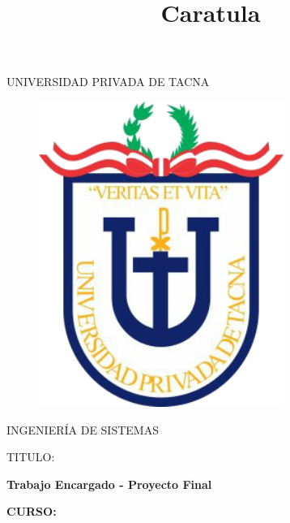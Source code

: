 \documentclass[12pt,letterpaper]{article}
\begin{document}
%


\title{Caratula}

\begin{titlepage}
\begin{center}
\large{UNIVERSIDAD PRIVADA DE TACNA}\\
\vspace*{-0.025in}
\begin{figure}[htb]
\begin{center}
\includegraphics[width=8cm]{./Imagenes/logo}
\end{center}
\end{figure}
\vspace*{0.15in}
INGENIERÍA DE SISTEMAS  \\

\vspace*{0.5in}
\begin{large}
TITULO:\\
\end{large}

\vspace*{0.1in}
\begin{Large}
\textbf{Trabajo Encargado - Proyecto Final} \\
\end{Large}

\vspace*{0.3in}
\begin{Large}
\textbf{CURSO:} \\
\end{Large}


\end{center}
\end{titlepage}
\end{document}
